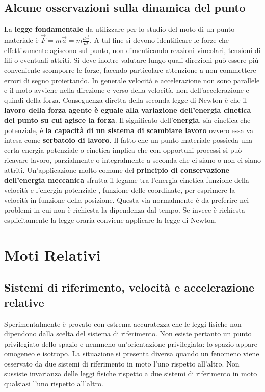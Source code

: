 \documentclass{article}
\numberwithin{equation}{subsection}
\begin{document}
\subsection{Alcune osservazioni sulla dinamica del punto}
La \textbf{legge fondamentale} da utilizzare per lo studio del moto di un punto materiale è $\vec{F}=m\vec{a}=m \frac{d\vec{v}}{dt}$. A tal fine si devono identificare le forze che effettivamente agiscono sul punto, non dimenticando reazioni vincolari, tensioni di fili o eventuali attriti. Si deve inoltre valutare lungo quali direzioni può essere più conveniente scomporre le forze, facendo particolare attenzione a non commettere errori di segno proiettando. In generale velocità e accelerazione non sono parallele e il moto avviene nella direzione e verso della velocità, non dell'accelerazione e quindi della forza. Conseguenza diretta della seconda legge di Newton è che il \textbf{lavoro della forza agente è eguale alla variazione dell'energia cinetica del punto su cui agisce la forza}. Il significato dell'\textbf{energia}, sia cinetica che potenziale, è \textbf{la capacità di un sistema di scambiare lavoro} ovvero essa va intesa come \textbf{serbatoio di lavoro}. Il fatto che un punto materiale possieda una certa energia potenziale o cinetica implica che con opportuni processi si può ricavare lavoro, parzialmente o integralmente a seconda che ci siano o non ci siano attriti. Un'applicazione molto comune del \textbf{principio di conservazione dell'energia meccanica} sfrutta il legame tra l'energia cinetica funzione della velocità e l'energia potenziale , funzione delle coordinate, per esprimere la velocità in funzione della posizione. Questa via normalmente è da preferire nei problemi in cui non è richiesta la dipendenza dal tempo. Se invece è richiesta esplicitamente la legge oraria conviene applicare la legge di Newton.
\section{Moti Relativi}
\subsection{Sistemi di riferimento, velocità e accelerazione relative}
Sperimentalmente è provato con estrema accuratezza che le leggi fisiche non dipendono dalla scelta del sistema di riferimento. Non esiste pertanto un punto privilegiato dello spazio e nemmeno un'orientazione privilegiata: lo spazio appare omogeneo e isotropo. La situazione si presenta diversa quando un fenomeno viene osservato da due sistemi di riferimento in moto l'uno rispetto all'altro. Non sussiste invarianza delle leggi fisiche rispetto a due sistemi di riferimento in moto qualsiasi l'uno rispetto all'altro.
\end{document}
